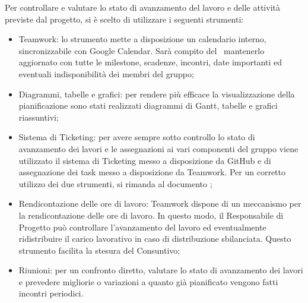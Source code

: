 \documentclass[../PianoProgetto.tex]{subfiles}
\begin{document}
Per controllare e valutare lo stato di avanzamento del lavoro e delle attività previste dal progetto, si è scelto di utilizzare i seguenti strumenti:
	\begin{itemize}
	\item Teamwork: lo strumento mette a disposizione un calendario interno, sincronizzabile con Google Calendar. Sarà compito del \responsabilediprogetto\ mantenerlo aggiornato con tutte le milestone, scadenze, incontri, date importanti ed eventuali indisponibilità dei membri del gruppo;
	\item Diagrammi, tabelle e grafici: per rendere più efficace la visualizzazione della pianificazione sono stati realizzati diagrammi di Gantt, tabelle e grafici riassuntivi;
	\item Sistema di Ticketing: per avere sempre sotto controllo lo stato di avanzamento dei lavori e le assegnazioni ai vari componenti del gruppo viene utilizzato il sistema di Ticketing messo a disposizione da GitHub e di assegnazione dei task messo a disposizione da Teamwork. Per un corretto utilizzo dei due strumenti, si rimanda al documento \normediprogetto;
	\item Rendicontazione delle ore di lavoro: Teamwork dispone di un meccanismo per la rendicontazione delle ore di lavoro. In questo modo, il Responsabile di Progetto può controllare l’avanzamento del lavoro ed eventualmente ridistribuire il carico lavorativo in caso di distribuzione sbilanciata. Questo strumento facilita la stesura del Consuntivo;
	\item Riunioni: per un confronto diretto, valutare lo stato di avanzamento dei lavori e prevedere migliorie o variazioni a quanto già pianificato vengono fatti incontri periodici.
	\end{itemize}
	
\end{document}
